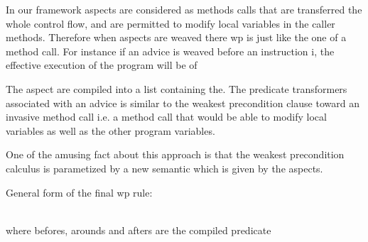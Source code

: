 In our framework aspects are considered as methods calls that are
transferred the whole control flow, and are permitted to modify local
variables in the caller methods. Therefore when aspects are weaved
there wp is just like the one of a method call.  For instance if an
advice is weaved before an instruction i, the effective execution of
the program will be of

The aspect are compiled into a list containing the.  The predicate
transformers associated with an advice is similar to the weakest
precondition clause toward an invasive method call i.e. a method call
that would be able to modify local variables as well as the other
program variables.

One of the amusing fact about this approach is that the weakest
precondition calculus is parametized by a new semantic which is given
by the aspects.

General form of the final wp rule:
\bcode

\\
\ecode
where befores, arounds and afters are the compiled predicate
